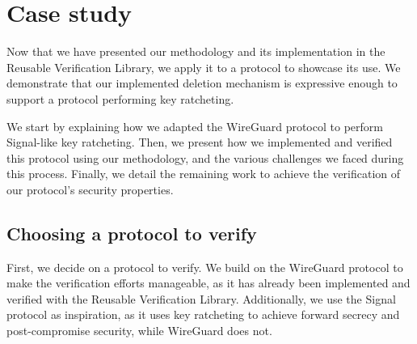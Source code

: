 
\chapter{Case study}
\label{chap:case-study}

Now that we have presented our methodology and its implementation in the Reusable Verification Library, we apply it to a protocol to showcase its use. 
We demonstrate that our implemented deletion mechanism is expressive enough to support a protocol performing key ratcheting.

We start by explaining how we adapted the WireGuard protocol to perform Signal-like key ratcheting.
Then, we present how we implemented and verified this protocol using our methodology, and the various challenges we faced during this process.
Finally, we detail the remaining work to achieve the verification of our protocol's security properties.

\section{Choosing a protocol to verify}
\label{sec:choosing-a-protocol-to-verify}

First, we decide on a protocol to verify.
We build on the WireGuard protocol to make the verification efforts manageable, as it has already been implemented and verified with the Reusable Verification Library.
Additionally, we use the Signal protocol as inspiration, as it uses key ratcheting to achieve forward secrecy and post-compromise security, while WireGuard does not.

